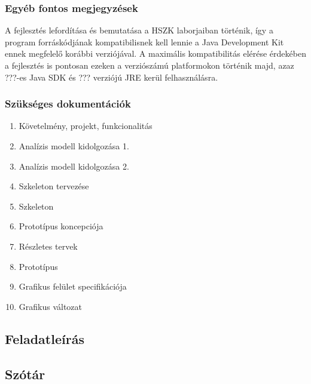    \subsubsection{Egyéb fontos megjegyzések}
	A fejlesztés lefordítása és bemutatása a HSZK laborjaiban történik, így a program forráskódjának kompatibilisnek kell lennie a Java Development Kit ennek megfelelő korábbi verziójával. A maximális kompatibilitás elérése érdekében a fejlesztés is pontosan ezeken a verziószámú platformokon történik majd, azaz ???-es Java SDK és ??? verziójú JRE kerül felhasználásra.

    \subsubsection{Szükséges dokumentációk}
	\begin{enumerate}
	\item Követelmény, projekt, funkcionalitás
	\item Analízis modell kidolgozása 1.
	\item Analízis modell kidolgozása 2.
	\item Szkeleton tervezése
	\item Szkeleton
	\item Prototípus koncepciója
	\item Részletes tervek
	\item Prototípus
	\item Grafikus felület specifikációja
	\item Grafikus változat
	\end{enumerate}
 
\subsection{Feladatleírás}
\subsection{Szótár}

